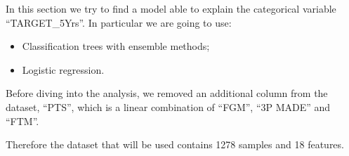 In this section we try to find a model able to explain the categorical variable ``TARGET\_5Yrs''.
In particular we are going to use:
\begin{itemize}
	\item Classification trees with ensemble methods;
	\item Logistic regression.
\end{itemize}

Before diving into the analysis, we removed an additional column from the dataset, ``PTS'', which is a linear combination of ``FGM'', ``3P MADE'' and ``FTM''.

Therefore the dataset that will be used contains 1278 samples and 18 features.
